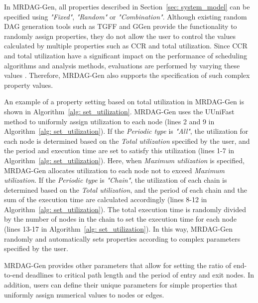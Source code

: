 In MRDAG-Gen, all properties described in Section~\ref{sec: system_model} can be specified using {\it "Fixed"}, {\it "Random"} or {\it "Combination"}.
Although existing random DAG generation tools such as TGFF and GGen provide the functionality to randomly assign properties, they do not allow the user to control the values calculated by multiple properties such as CCR and total utilization.
Since CCR and total utilization have a significant impact on the performance of scheduling algorithms and analysis methods, evaluations are performed by varying these values \cite{he2021response, agrawal2020hard, senapati2021hmds, sulaiman2021hybrid}.
Therefore, MRDAG-Gen also supports the specification of such complex property values.

An example of a property setting based on total utilization in MRDAG-Gen is shown in Algorithm~\ref{alg: set_utilization}.
MRDAG-Gen uses the UUniFast method \cite{bini2005measuring} to uniformly assign utilization to each node (lines 2 and 9 in Algorithm~\ref{alg: set_utilization}).
If the {\it Periodic type} is {\it "All"}, the utilization for each node is determined based on the {\it Total utilization} specified by the user, and the period and execution time are set to satisfy this utilization (lines 1-7 in Algorithm~\ref{alg: set_utilization}).
Here, when {\it Maximum utilization} is specified, MRDAG-Gen allocates utilization to each node not to exceed {\it Maximum utilization}.
If the {\it Periodic type} is {\it "Chain"}, the utilization of each chain is determined based on the {\it Total utilization}, and the period of each chain and the sum of the execution time are calculated accordingly (lines 8-12 in Algorithm~\ref{alg: set_utilization}).
The total execution time is randomly divided by the number of nodes in the chain to set the execution time for each node (lines 13-17 in Algorithm~\ref{alg: set_utilization}).
In this way, MRDAG-Gen randomly and automatically sets properties according to complex parameters specified by the user.

MRDAG-Gen provides other parameters that allow for setting the ratio of end-to-end deadlines to critical path length and the period of entry and exit nodes.
In addition, users can define their unique parameters for simple properties that uniformly assign numerical values to nodes or edges.
